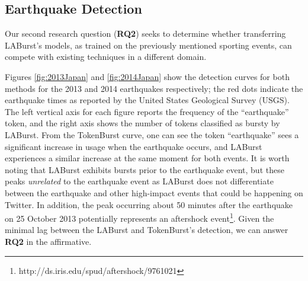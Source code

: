 \documentclass[letterpaper]{article}
\begin{document}
\subsection{Earthquake Detection}

Our second research question (\textbf{RQ2}) seeks to determine whether transferring LABurst's models, as trained on the previously mentioned sporting events, can compete with existing techniques in a different domain.

Figures \ref{fig:2013Japan} and \ref{fig:2014Japan} show the detection curves for both methods for the 2013 and 2014 earthquakes respectively; the red dots indicate the earthquake times as reported by the United States Geological Survey (USGS).
The left vertical axis for each figure reports the frequency of the ``earthquake'' token, and the right axis shows the number of tokens classified as bursty by LABurst.
From the TokenBurst curve, one can see the token ``earthquake'' sees a significant increase in usage when the earthquake occurs, and LABurst experiences a similar increase at the same moment for both events.
It is worth noting that LABurst exhibits bursts prior to the earthquake event, but these peaks \emph{unrelated} to the earthquake event as LABurst does not differentiate between the earthquake and other high-impact events that could be happening on Twitter. 
In addition, the peak occurring about 50 minutes after the earthquake on 25 October 2013 potentially represents an aftershock event\footnote{http://ds.iris.edu/spud/aftershock/9761021}.
Given the minimal lag between the LABurst and TokenBurst's detection, we can answer \textbf{RQ2} in the affirmative. 
\end{document}
